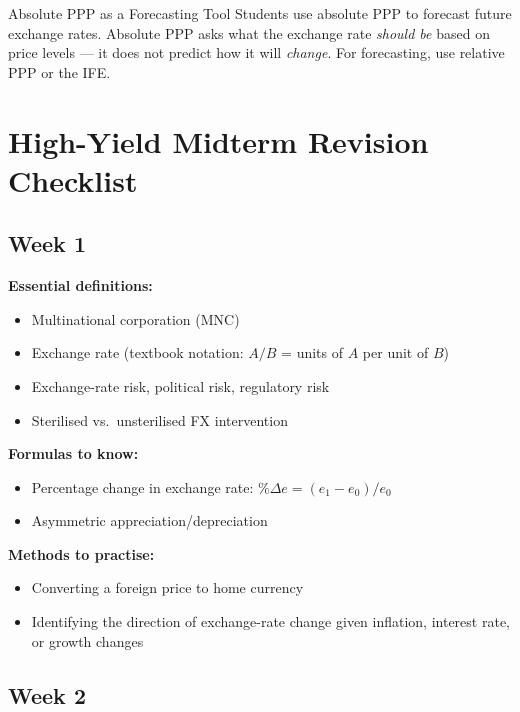 \documentclass[11pt,a4paper]{article}
\newcommand{\cb}{\(\square\)\enspace}
\begin{document}
\begin{mistakebox}{Absolute PPP as a Forecasting Tool}
Students use absolute PPP to forecast future exchange rates. Absolute PPP asks what the exchange rate \textit{should be} based on price levels --- it does not predict how it will \textit{change}. For forecasting, use relative PPP or the IFE.
\end{mistakebox}

\newpage

\section{High-Yield Midterm Revision Checklist}

\subsection*{Week 1}

\textbf{Essential definitions:}
\begin{itemize}[leftmargin=2em]
  \item[\cb] Multinational corporation (MNC)
  \item[\cb] Exchange rate (textbook notation: $A/B$ = units of $A$ per unit of $B$)
  \item[\cb] Exchange-rate risk, political risk, regulatory risk
  \item[\cb] Sterilised vs.\ unsterilised FX intervention
\end{itemize}

\textbf{Formulas to know:}
\begin{itemize}[leftmargin=2em]
  \item[\cb] Percentage change in exchange rate: $\%\Delta e = (e_1 - e_0)/e_0$
  \item[\cb] Asymmetric appreciation/depreciation
\end{itemize}

\textbf{Methods to practise:}
\begin{itemize}[leftmargin=2em]
  \item[\cb] Converting a foreign price to home currency
  \item[\cb] Identifying the direction of exchange-rate change given inflation, interest rate, or growth changes
\end{itemize}

\subsection*{Week 2}
\end{document}
